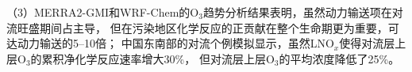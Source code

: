 （3）MERRA2-GMI和WRF-Chem的O$_3$趋势分析结果表明，虽然动力输送项在对流旺盛期间占主导，
但在污染地区化学反应的正贡献在整个生命期更为重要，可达动力输送的5--10倍；
中国东南部的对流个例模拟显示，虽然LNO$_x$使得对流层上层O$_3$的累积净化学反应速率增大30\%，
但对流层上层O$_3$的平均浓度降低了25\%。








